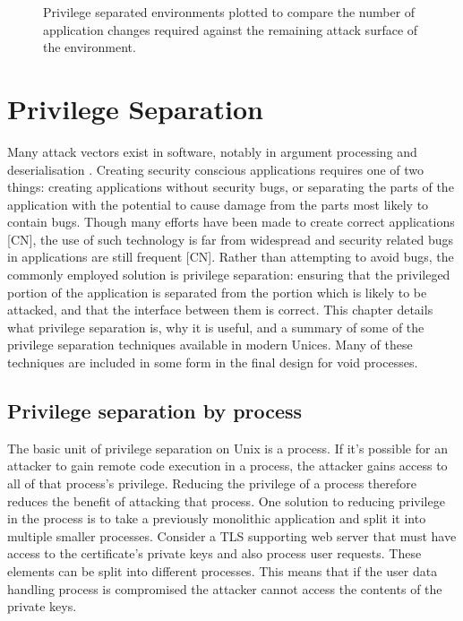 \documentclass[12pt,a4paper,twoside]{report}
\begin{document}
\begin{figure}[h]
    \centering
    
    
    \caption{Privilege separated environments plotted to compare the number of application changes required against the remaining attack surface of the environment.}
    \label{fig:attack-vs-changes}
\end{figure}


\chapter{Privilege Separation}
\label{chap:priv-sep}

Many attack vectors exist in software, notably in argument processing and deserialisation \citep{the_mitre_corporation_deserialization_2006,the_mitre_corporation_improper_2006}. Creating security conscious applications requires one of two things: creating applications without security bugs, or separating the parts of the application with the potential to cause damage from the parts most likely to contain bugs. Though many efforts have been made to create correct applications [CN], the use of such technology is far from widespread and security related bugs in applications are still frequent [CN]. Rather than attempting to avoid bugs, the commonly employed solution is privilege separation: ensuring that the privileged portion of the application is separated from the portion which is likely to be attacked, and that the interface between them is correct. This chapter details what privilege separation is, why it is useful, and a summary of some of the privilege separation techniques available in modern Unices. Many of these techniques are included in some form in the final design for void processes.

\section{Privilege separation by process}
\label{sec:priv-sep-process}

The basic unit of privilege separation on Unix is a process. If it's possible for an attacker to gain remote code execution in a process, the attacker gains access to all of that process's privilege. Reducing the privilege of a process therefore reduces the benefit of attacking that process. One solution to reducing privilege in the process is to take a previously monolithic application and split it into multiple smaller processes. Consider a TLS supporting web server that must have access to the certificate's private keys and also process user requests. These elements can be split into different processes. This means that if the user data handling process is compromised the attacker cannot access the contents of the private keys.
\end{document}
